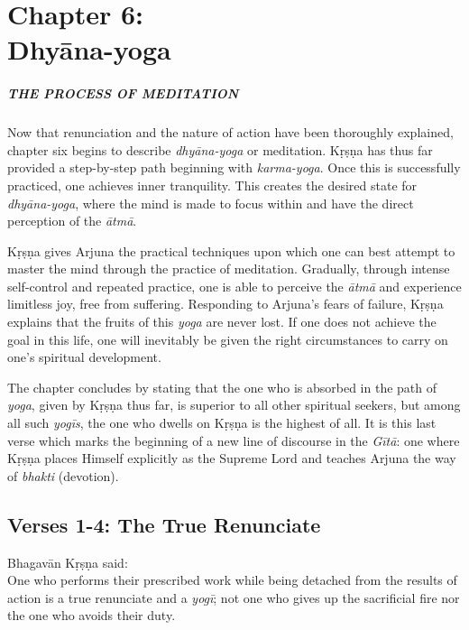 \chapter{Chapter 6: \\Dhyāna-yoga}\label{chap-dhyana-yoga}

\paragraph*{\MakeUppercase{The Process of Meditation}}

\noindent Now that renunciation and the nature of action have been thoroughly explained, chapter six begins to describe \textit{dhyāna-yoga} or meditation. Kṛṣṇa has thus far provided a step-by-step path beginning with \textit{karma-yoga}. Once this is successfully practiced, one achieves inner tranquility. This creates the desired state for \textit{dhyāna-yoga}, where the mind is made to focus within and have the direct perception of the \textit{ātmā}.

Kṛṣṇa gives Arjuna the practical techniques upon which one can best attempt to master the mind through the practice of meditation. Gradually, through intense self-control and repeated practice, one is able to perceive the \textit{ātmā} and experience limitless joy, free from suffering. Responding to Arjuna’s fears of failure, Kṛṣṇa explains that the fruits of this \textit{yoga} are never lost. If one does not achieve the goal in this life, one will inevitably be given the right circumstances to carry on one’s spiritual development.

The chapter concludes by stating that the one who is absorbed in the path of \textit{yoga}, given by Kṛṣṇa thus far, is superior to all other spiritual seekers, but among all such \textit{yogīs}, the one who dwells on Kṛṣṇa is the highest of all. It is this last verse which marks the beginning of a new line of discourse in the \textit{Gītā}: one where Kṛṣṇa places Himself explicitly as the Supreme Lord and teaches Arjuna the way of \textit{bhakti} (devotion).

\section{Verses 1-4: The True Renunciate}\label{sec-verses-1-4-the-true-renunciate}

{\hspace*{1em}Bhagavān Kṛṣṇa said: \\
One who performs their prescribed work while being detached from the results of action is a true renunciate and a \textit{yogī}; not one who gives up the sacrificial fire nor the one who avoids their duty.}

